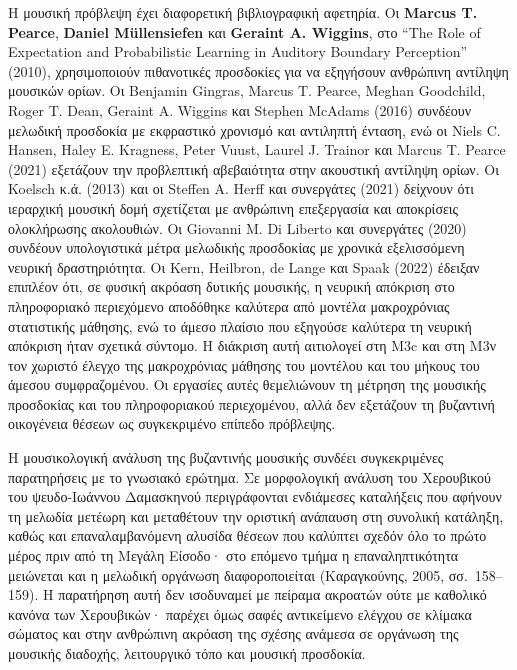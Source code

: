 \documentclass[11pt,a4paper]{article}
\begin{document}
Η μουσική πρόβλεψη έχει διαφορετική βιβλιογραφική αφετηρία. Οι \textbf{Marcus T. Pearce}, \textbf{Daniel Müllensiefen} και \textbf{Geraint A. Wiggins}, στο ``The Role of Expectation and Probabilistic Learning in Auditory Boundary Perception'' (2010), χρησιμοποιούν πιθανοτικές προσδοκίες για να εξηγήσουν ανθρώπινη αντίληψη μουσικών ορίων. Οι Benjamin Gingras, Marcus T. Pearce, Meghan Goodchild, Roger T. Dean, Geraint A. Wiggins και Stephen McAdams (2016) συνδέουν μελωδική προσδοκία με εκφραστικό χρονισμό και αντιληπτή ένταση, ενώ οι Niels C. Hansen, Haley E. Kragness, Peter Vuust, Laurel J. Trainor και Marcus T. Pearce (2021) εξετάζουν την προβλεπτική αβεβαιότητα στην ακουστική αντίληψη ορίων. Οι Koelsch κ.ά. (2013) και οι Steffen A. Herff και συνεργάτες (2021) δείχνουν ότι ιεραρχική μουσική δομή σχετίζεται με ανθρώπινη επεξεργασία και αποκρίσεις ολοκλήρωσης ακολουθιών. Οι Giovanni M. Di Liberto και συνεργάτες (2020) συνδέουν υπολογιστικά μέτρα μελωδικής προσδοκίας με χρονικά εξελισσόμενη νευρική δραστηριότητα. Οι Kern, Heilbron, de Lange και Spaak (2022) έδειξαν επιπλέον ότι, σε φυσική ακρόαση δυτικής μουσικής, η νευρική απόκριση στο πληροφοριακό περιεχόμενο αποδόθηκε καλύτερα από μοντέλα μακροχρόνιας στατιστικής μάθησης, ενώ το άμεσο πλαίσιο που εξηγούσε καλύτερα τη νευρική απόκριση ήταν σχετικά σύντομο. Η διάκριση αυτή αιτιολογεί στη M3c και στη M3ν τον χωριστό έλεγχο της μακροχρόνιας μάθησης του μοντέλου και του μήκους του άμεσου συμφραζομένου. Οι εργασίες αυτές θεμελιώνουν τη μέτρηση της μουσικής προσδοκίας και του πληροφοριακού περιεχομένου, αλλά δεν εξετάζουν τη βυζαντινή οικογένεια θέσεων ως συγκεκριμένο επίπεδο πρόβλεψης.

Η μουσικολογική ανάλυση της βυζαντινής μουσικής συνδέει συγκεκριμένες παρατηρήσεις με το γνωσιακό ερώτημα. Σε μορφολογική ανάλυση του Χερουβικού του ψευδο-Ιωάννου Δαμασκηνού περιγράφονται ενδιάμεσες καταλήξεις που αφήνουν τη μελωδία μετέωρη και μεταθέτουν την οριστική ανάπαυση στη συνολική κατάληξη, καθώς και επαναλαμβανόμενη αλυσίδα θέσεων που καλύπτει σχεδόν όλο το πρώτο μέρος πριν από τη Μεγάλη Είσοδο· στο επόμενο τμήμα η επαναληπτικότητα μειώνεται και η μελωδική οργάνωση διαφοροποιείται (Καραγκούνης, 2005, σσ.~158--159). Η παρατήρηση αυτή δεν ισοδυναμεί με πείραμα ακροατών ούτε με καθολικό κανόνα των Χερουβικών· παρέχει όμως σαφές αντικείμενο ελέγχου σε κλίμακα σώματος και στην ανθρώπινη ακρόαση της σχέσης ανάμεσα σε οργάνωση της μουσικής διαδοχής, λειτουργικό τόπο και μουσική προσδοκία.
\end{document}
